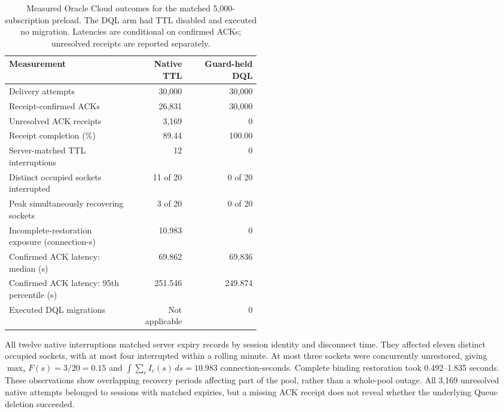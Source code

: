 \begin{table}[!htbp]
 \centering
 \small
 \renewcommand{\arraystretch}{1.14}
 \caption{Measured Oracle Cloud outcomes for the matched 5,000-subscription
 preload. The DQL arm had TTL disabled and executed no migration. Latencies
 are conditional on confirmed ACKs; unresolved receipts are reported separately.}
 \label{tab:ttl-preload-results}
 \begin{tabular}{p{0.49\linewidth}rr}
  \toprule
  Measurement & Native TTL & Guard-held DQL \\
  \midrule
  Delivery attempts & 30,000 & 30,000 \\
  Receipt-confirmed ACKs & 26,831 & 30,000 \\
  Unresolved ACK receipts & 3,169 & 0 \\
  Receipt completion (\%) & 89.44 & 100.00 \\
  Server-matched TTL interruptions & 12 & 0 \\
  Distinct occupied sockets interrupted & 11 of 20 & 0 of 20 \\
  Peak simultaneously recovering sockets & 3 of 20 & 0 of 20 \\
  Incomplete-restoration exposure (connection-s) & 10.983 & 0 \\
  Confirmed ACK latency: median (s) & 69.862 & 69.836 \\
  Confirmed ACK latency: 95th percentile (s) & 251.546 & 249.874 \\
  Executed DQL migrations & Not applicable & 0 \\
  \bottomrule
 \end{tabular}
\end{table}

All twelve native interruptions matched server expiry records by session
identity and disconnect time. They affected eleven distinct occupied sockets,
with at most four interrupted within a rolling minute. At most three sockets
were concurrently unrestored, giving $\max_s F(s)=3/20=0.15$ and
$\int\sum_c I_c(s)\,ds=10.983$ connection-seconds. Complete binding
restoration took 0.492--1.835 seconds. These observations show overlapping
recovery periods affecting part of the pool, rather than a whole-pool outage. All 3,169 unresolved native
attempts belonged to sessions with matched expiries, but a missing ACK receipt
does not reveal whether the underlying Queue deletion succeeded.

